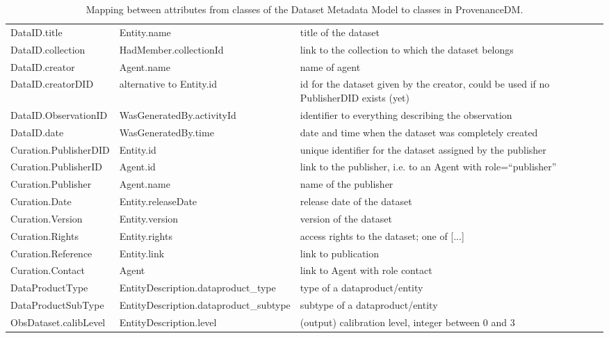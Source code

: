 \begin{table}[h]
\small
{}\textwidth
\begin{tabulary}{1.0\textwidth}{@{}lLp{4cm}@{}}
\toprule
{} &  & \\
\midrule
DataID.title         & Entity.name                & title of the dataset\\
DataID.collection    & HadMember.collectionId     & link to the collection to which the dataset belongs\\
DataID.creator       & Agent.name                 & name of agent\\
DataID.creatorDID    & alternative to Entity.id   & id for the dataset given by the creator, could be used if no PublisherDID exists (yet)\\
DataID.ObservationID & WasGeneratedBy.activityId  & identifier to everything describing the observation\\
DataID.date          & WasGeneratedBy.time        & date and time when the dataset was completely created\\
Curation.PublisherDID  & Entity.id                & unique identifier for the dataset assigned by the publisher\\
Curation.PublisherID   & Agent.id                 & link to the publisher, i.e. to an Agent with role=``publisher''\\
Curation.Publisher     & Agent.name               & name of the publisher\\
Curation.Date          & Entity.releaseDate       & release date of the dataset\\
Curation.Version       & Entity.version           & version of the dataset\\
Curation.Rights        & Entity.rights            & access rights to the dataset; one of [...]\\
Curation.Reference     & Entity.link              & link to publication\\
Curation.Contact       & Agent                    & link to Agent with role contact\\
DataProductType  & EntityDescription.dataproduct\_type & type of a dataproduct/entity\\
DataProductSubType & EntityDescription.dataproduct\_subtype & subtype of a dataproduct/entity\\
ObsDataset.calibLevel  & EntityDescription.level & (output) calibration level, integer between 0 and 3\\\hline
\bottomrule
\end{tabulary}
\caption{Mapping between attributes from classes of the Dataset Metadata Model to classes in ProvenanceDM.}
\label{tab:datasetmapping}
\end{table}




